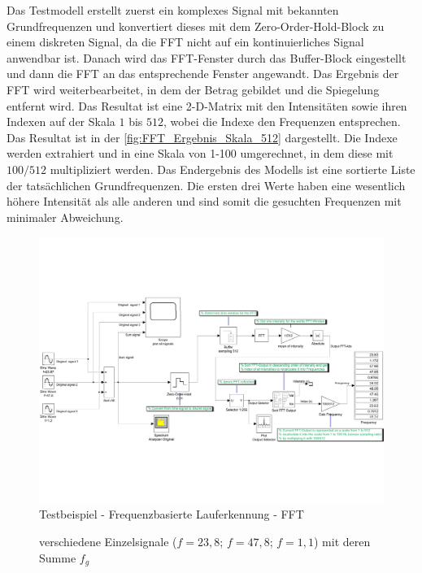 Das Testmodell erstellt zuerst ein komplexes Signal mit bekannten Grundfrequenzen und konvertiert dieses mit dem \glqq Zero-Order-Hold\grqq{}-Block zu einem diskreten Signal, da die FFT nicht auf ein kontinuierliches Signal anwendbar ist. Danach wird das FFT-Fenster durch das \glqq Buffer\grqq{}-Block eingestellt und dann die FFT an das entsprechende Fenster angewandt. Das Ergebnis der FFT wird weiterbearbeitet, in dem der Betrag gebildet und die Spiegelung entfernt wird. Das Resultat ist eine 2-D-Matrix mit den Intensitäten sowie ihren Indexen auf der Skala $1$ bis $512$, wobei die Indexe den Frequenzen entsprechen. Das Resultat ist in der \autoref{fig:FFT_Ergebnis_Skala_512} dargestellt. Die Indexe werden extrahiert und in eine Skala von 1-100 umgerechnet, in dem diese mit $100/512$ multipliziert werden.
Das Endergebnis des Modells ist eine sortierte Liste der tatsächlichen Grundfrequenzen. Die ersten drei Werte haben eine wesentlich höhere Intensität als alle anderen und sind somit die gesuchten Frequenzen mit minimaler Abweichung.

\begin{landscape}
	\begin{figure}
		\centering
		\includegraphics[width=\linewidth]{Bilder/Lauferkennung_FFT_Testmodell1.pdf}
		\caption{Testbeispiel - Frequenzbasierte Lauferkennung - FFT}
		\label{fig:Lauferkennung_Freqbasiert_FFT_Testmodell}
	\end{figure}
\end{landscape}

\begin{figure}
	\centering
	\caption{verschiedene Einzelsignale ($f=23,8$; $f=47,8$; $f=1,1$) mit deren Summe $f_g$}
	\label{fig:Testsignal_AllViews}
\end{figure}

